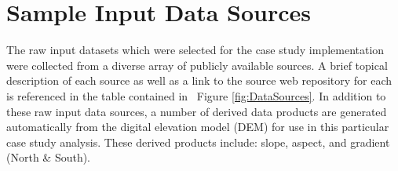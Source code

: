     \section{Sample Input Data Sources}
    
The raw input datasets which were selected for the case study implementation were collected from a diverse array of publicly available sources. A brief topical description of each source as well as a link to the source web repository for each is referenced in the table contained in ~Figure \ref{fig:DataSources}. In addition to these raw input data sources, a number of derived data products are generated automatically from the digital elevation model (DEM) for use in this particular case study analysis. These derived products include: slope, aspect, and gradient (North \& South).

